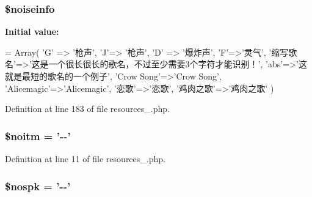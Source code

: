 \hypertarget{cache_2resources__1_8php_a332324f513227af3ea62265b79326383}{
\subsubsection[{\$noiseinfo}]{\setlength{\rightskip}{0pt plus 5cm}\$noiseinfo}}\label{cache_2resources__1_8php_a332324f513227af3ea62265b79326383}
{\bfseries Initial value\+:}
\begin{DoxyCode}
= Array(
    \textcolor{charliteral}{'G'} => \textcolor{stringliteral}{'枪声'},
    \textcolor{charliteral}{'J'}=> \textcolor{stringliteral}{'枪声'},
    \textcolor{charliteral}{'D'} => \textcolor{stringliteral}{'爆炸声'},
    \textcolor{charliteral}{'F'}=>\textcolor{stringliteral}{'灵气'},
    \textcolor{stringliteral}{'缩写歌名'}=>\textcolor{stringliteral}{'这是一个很长很长的歌名，不过至少需要3个字符才能识别！'},
    \textcolor{stringliteral}{'abs'}=>\textcolor{stringliteral}{'这就是最短的歌名的一个例子'},
    \textcolor{stringliteral}{'Crow Song'}=>\textcolor{stringliteral}{'Crow Song'},
    \textcolor{stringliteral}{'Alicemagic'}=>\textcolor{stringliteral}{'Alicemagic'},
    \textcolor{stringliteral}{'恋歌'}=>\textcolor{stringliteral}{'恋歌'},
    \textcolor{stringliteral}{'鸡肉之歌'}=>\textcolor{stringliteral}{'鸡肉之歌'}
    )
\end{DoxyCode}


Definition at line 183 of file resources\+\_.\+php.

\hypertarget{cache_2resources__1_8php_ad51c71e4cc6cd78c709454b5f2a2f84c}{
\subsubsection[{\$noitm}]{\setlength{\rightskip}{0pt plus 5cm}\$noitm = '-\/-\/'}}\label{cache_2resources__1_8php_ad51c71e4cc6cd78c709454b5f2a2f84c}


Definition at line 11 of file resources\+\_.\+php.

\hypertarget{cache_2resources__1_8php_a472cdfe07d9d5ca35696f2aa6848fd0c}{
\subsubsection[{\$nospk}]{\setlength{\rightskip}{0pt plus 5cm}\$nospk = '-\/-\/'}}\label{cache_2resources__1_8php_a472cdfe07d9d5ca35696f2aa6848fd0c}


